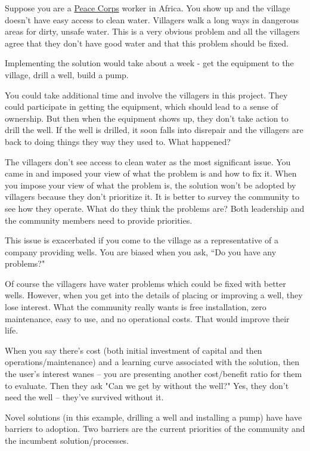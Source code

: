 Suppose you are a \href{http://www.peacecorps.gov/}{Peace Corps} worker in Africa. You show up and the village doesn't have easy access to clean water. Villagers walk a long ways in dangerous areas for dirty, unsafe water. This is a very obvious problem and all the villagers agree that they don't have good water and that this problem should be fixed.

Implementing the solution would take about a week - get the equipment to the village, drill a well, build a pump.

You could take additional time and involve the villagers in this project. They could participate in getting the equipment, which should lead to a sense of ownership.
But then when the equipment shows up, they don't take action to drill the well. If the well is drilled, it soon falls into disrepair and the villagers are back to doing things they way they used to. What happened?

The villagers don't see access to clean water as the most significant issue. You came in and imposed your view of what the problem is and how to fix it. When you impose your view of what the problem is, the solution won't be adopted by villagers because they don't prioritize it.
It is better to survey the community to see how they operate. What do they think the problems are?
Both leadership and the community members need to provide priorities.

This issue is exacerbated if you come to the village as a representative of a company providing wells. You are biased when you ask, ``Do you have any problems?"

Of course the villagers have water problems which could be fixed with better wells. However, when you get into the details of placing or improving a well, they lose interest. What the community really wants is free installation, zero maintenance, easy to use, and no operational costs. That would improve their life.

When you say there's cost (both initial investment of capital and then operations/maintenance) and a learning curve associated with the solution, then the user's interest wanes -- you are presenting another cost/benefit ratio for them to evaluate. Then they ask "Can we get by without the well?" Yes, they don't need the well -- they've survived without it.

Novel solutions (in this example, drilling a well and installing a pump) have have barriers to adoption. Two barriers are the current priorities of the community and the incumbent solution/processes.

